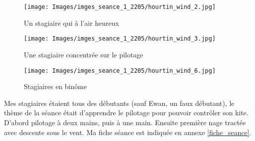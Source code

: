 \documentclass[11pt,a4paper]{report}
\begin{document}
\begin{figure}
\begin{minipage}{0.4\textwidth}
\texttt{[image: Images/imges\_seance\_1\_2205/hourtin\_wind\_2.jpg]} 
\caption{Un stagiaire qui à l'air heureux}
\end{minipage}
\hfill
\begin{minipage}{0.4\textwidth}
\texttt{[image: Images/imges\_seance\_1\_2205/hourtin\_wind\_3.jpg]} 
\caption{Une stagiaire concentrée sur le pilotage}
\end{minipage}
\end{figure}

\begin{figure}
\texttt{[image: Images/imges\_seance\_1\_2205/hourtin\_wind\_6.jpg]}
\caption{Stagiaires en bin\^ome} 
\end{figure}

Mes stagiaires étaient tous des débutants (sauf Ewan, un faux débutant), 
le thème de la séance était d'apprendre le pilotage pour pouvoir contrôler son kite.
D'abord pilotage à deux mains, puis à une main. 
Ensuite première nage tractée avec descente sous 
le vent. Ma fiche séance est indiquée en annexe \ref{fiche_seance}.
\end{document}
